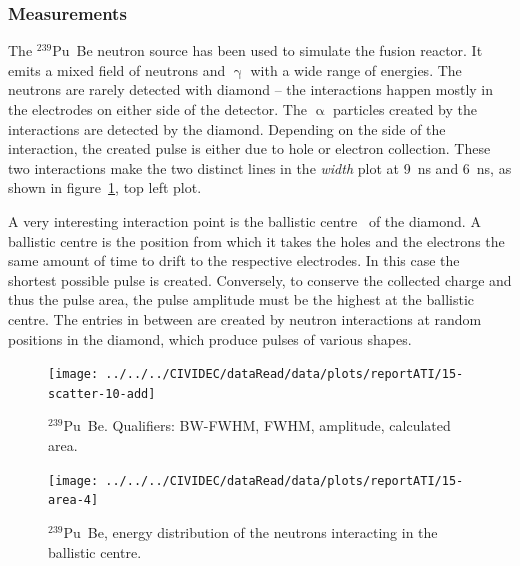 \subsubsection{Measurements}
The $^{239}$Pu~Be neutron source has been used to simulate the fusion reactor. It emits a mixed field of neutrons and $\upgamma$ with a wide range of energies. The neutrons are rarely detected with diamond -- the interactions happen mostly in the electrodes on either side of the detector. The $\upalpha$ particles created by the interactions are detected by the diamond. Depending on the side of the interaction, the created pulse is either due to hole or electron collection. These two interactions make the two distinct lines in the \emph{width} plot at 9~ns and 6~ns, as shown in figure~\ref{fig:scatterpu}, top left plot. 

A very interesting interaction point is the ballistic centre~\cite{PAVEL:00001, CHRISSI:00005} of the diamond. A ballistic centre is the position from which it takes the holes and the electrons the same amount of time to drift to the respective electrodes. In this case the shortest possible pulse is created. Conversely, to conserve the collected charge and thus the pulse area, the pulse amplitude must be the highest at the ballistic centre. The entries in between are created by neutron interactions at random positions in the diamond, which produce pulses of various shapes. 

\clearpage
\begin{figure}[]
\centering
\texttt{[image: ../../../CIVIDEC/dataRead/data/plots/reportATI/15-scatter-10-add]}
\caption{$^{239}$Pu~Be. Qualifiers: BW-FWHM, FWHM, amplitude, calculated area.}
\label{fig:scatterpu}
\end{figure}

\clearpage
\begin{figure}[!t]
\centering
\texttt{[image: ../../../CIVIDEC/dataRead/data/plots/reportATI/15-area-4]}
\caption{$^{239}$Pu~Be, energy distribution of the neutrons interacting in the ballistic centre.}
\label{fig:scatterpuarea}
\end{figure}

